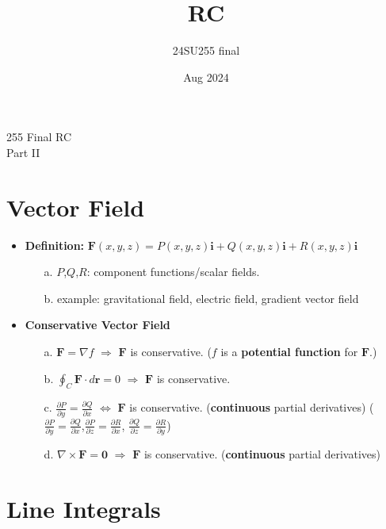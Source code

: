 \documentclass{article}
\title{RC}
\author{24SU255 final }
\date{Aug 2024}
\begin{document}
\begin{center}
    \Large 255 Final RC \\
    \Large Part II \\
    
\end{center}


\section{Vector Field}

\begin{itemize}
    \item \textbf{Definition: }$\boldsymbol{F}(x,y,z)=P(x,y,z)\boldsymbol{i}+Q(x,y,z)\boldsymbol{i}+R(x,y,z)\boldsymbol{i}$
        \begin{itemize}
            \item [a.] $P$,$Q$,$R$: component functions/scalar fields.
            \item [b.] example: gravitational field, electric field, gradient vector field
        \end{itemize}
    \item \textbf{Conservative Vector Field} 
        \begin{itemize}
            \item [a.] $\boldsymbol{F}=\nabla f$ $\Rightarrow$ $\boldsymbol{F}$ is conservative. ($f$ is a \textbf{potential function} for $\boldsymbol{F}$.)
            \item [b.] $\oint_C \boldsymbol{F}\cdot d\boldsymbol{r} = 0$ $\Rightarrow$ $\boldsymbol{F}$ is conservative.
            \item [c.] $\frac{\partial P}{\partial y}=\frac{\partial Q}{\partial x}$ $\Longleftrightarrow$ $\boldsymbol{F}$ is conservative. (\textbf{continuous} partial derivatives) 
            ($\frac{\partial P}{\partial y}=\frac{\partial Q}{\partial x}$,$\frac{\partial P}{\partial z}=\frac{\partial R}{\partial x}$, $\frac{\partial Q}{\partial z}=\frac{\partial R}{\partial y}$)
            \item [d.] $\nabla \times\boldsymbol{F}=\boldsymbol{0}$ $\Rightarrow$ $\boldsymbol{F}$ is conservative. (\textbf{continuous} partial derivatives)\\
        \end{itemize}
\end{itemize}


\section{Line Integrals}
\end{document}
